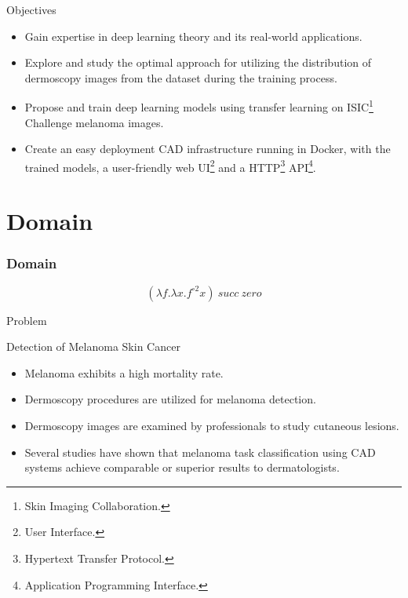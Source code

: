 \documentclass[dvipsnames,mathserif]{beamer}
\begin{document}
{    \begin{frame}
      \large Objectives
      \vspace{0.25cm}

      \footnotesize
      \begin{itemize}
        \item Gain expertise in deep learning theory and its real-world
          applications.
        \item Explore and study the optimal approach for utilizing the distribution
          of dermoscopy images from the dataset during the training process.
        \item Propose and train deep learning models using transfer learning on ISIC\footnote{Skin Imaging Collaboration.}
          Challenge melanoma images.
        \item Create an easy deployment CAD infrastructure running in Docker,
          with the trained models, a user-friendly web UI\footnote{User
          Interface.} and a HTTP\footnote{Hypertext Transfer Protocol.} API\footnote{Application Programming Interface.}.
      \end{itemize}


    \end{frame}

    \section{Domain}

    \begin{frame}
      \frametitle{Domain}

      \[(\lambda f. \lambda x. f^{\circ 2} x)\ succ\ zero\]
    \end{frame}

    \begin{frame}
      \begin{center}
        \Huge Problem
      \end{center}
    \end{frame}


    \begin{frame}
      \large Detection of Melanoma Skin Cancer
      \vspace{0.25cm}

      \footnotesize
      \begin{itemize}
        \item Melanoma exhibits a high mortality rate.
        \item Dermoscopy procedures are utilized for melanoma detection.
        \item Dermoscopy images are examined by professionals to study cutaneous lesions.
        \item Several studies have shown that melanoma task classification
          using CAD systems achieve comparable or superior results to
          dermatologists.
      \end{itemize}



\end{frame}}
\end{document}
